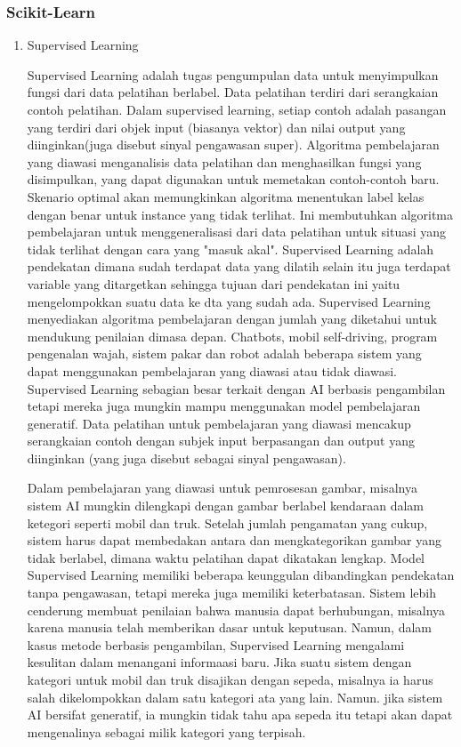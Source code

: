 \subsubsection{Scikit-Learn}
\begin{enumerate}
    \item{Supervised Learning}
    \par Supervised Learning adalah tugas pengumpulan data untuk menyimpulkan fungsi dari data pelatihan berlabel. Data pelatihan terdiri dari serangkaian contoh pelatihan. Dalam supervised learning, setiap contoh adalah pasangan yang terdiri dari objek input (biasanya vektor) dan nilai output yang diinginkan(juga disebut sinyal pengawasan super). Algoritma pembelajaran yang diawasi menganalisis data pelatihan dan menghasilkan fungsi yang disimpulkan, yang dapat digunakan untuk memetakan contoh-contoh baru. Skenario optimal akan memungkinkan algoritma menentukan label kelas dengan benar untuk instance yang tidak terlihat. Ini membutuhkan algoritma pembelajaran untuk menggeneralisasi dari data pelatihan untuk situasi yang tidak terlihat dengan cara yang "masuk akal". Supervised Learning adalah pendekatan dimana sudah terdapat data yang dilatih selain itu juga terdapat variable yang ditargetkan sehingga tujuan dari pendekatan ini yaitu mengelompokkan suatu data ke dta yang sudah ada. Supervised Learning menyediakan algoritma pembelajaran dengan jumlah yang diketahui untuk mendukung penilaian dimasa depan. Chatbots, mobil self-driving, program pengenalan wajah, sistem pakar dan robot adalah beberapa sistem yang dapat menggunakan pembelajaran yang diawasi atau tidak diawasi. Supervised Learning sebagian besar terkait dengan AI berbasis pengambilan tetapi mereka juga mungkin mampu menggunakan model pembelajaran generatif. Data pelatihan untuk pembelajaran yang diawasi mencakup serangkaian contoh dengan subjek input berpasangan dan output yang diinginkan (yang juga disebut sebagai sinyal pengawasan).

    Dalam pembelajaran yang diawasi untuk pemrosesan gambar, misalnya sistem AI mungkin dilengkapi dengan gambar berlabel kendaraan dalam ketegori seperti mobil dan truk. Setelah jumlah pengamatan yang cukup, sistem harus dapat membedakan antara dan mengkategorikan gambar yang tidak berlabel, dimana waktu pelatihan dapat dikatakan lengkap. Model Supervised Learning memiliki beberapa keunggulan dibandingkan pendekatan tanpa pengawasan, tetapi mereka juga memiliki keterbatasan. Sistem lebih cenderung membuat penilaian bahwa manusia dapat berhubungan, misalnya karena manusia telah memberikan dasar untuk keputusan. Namun, dalam kasus metode berbasis pengambilan, Supervised Learning mengalami kesulitan dalam menangani informaasi baru. Jika suatu sistem dengan kategori untuk mobil dan truk disajikan dengan sepeda, misalnya ia harus salah dikelompokkan dalam satu kategori ata yang lain. Namun. jika sistem AI bersifat generatif, ia mungkin tidak tahu apa sepeda itu tetapi akan dapat mengenalinya sebagai milik kategori yang terpisah.


\end{enumerate}
